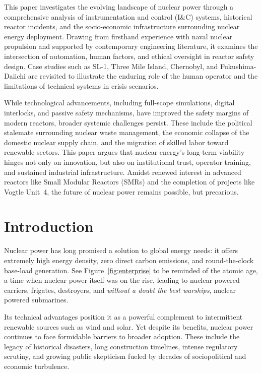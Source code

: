 \documentclass[12pt]{article}
\begin{document}
This paper investigates the evolving landscape of nuclear power through a comprehensive analysis of instrumentation and control (I\&C) systems, historical reactor incidents, and the socio-economic infrastructure surrounding nuclear energy deployment. Drawing from firsthand experience with naval nuclear propulsion and supported by contemporary engineering literature, it examines the intersection of automation, human factors, and ethical oversight in reactor safety design. Case studies such as SL-1, Three Mile Island, Chernobyl, and Fukushima-Daiichi are revisited to illustrate the enduring role of the human operator and the limitations of technical systems in crisis scenarios.

While technological advancements, including full-scope simulations, digital interlocks, and passive safety mechanisms, have improved the safety margins of modern reactors, broader systemic challenges persist. These include the political stalemate surrounding nuclear waste management, the economic collapse of the domestic nuclear supply chain, and the migration of skilled labor toward renewable sectors. This paper argues that nuclear energy's long-term viability hinges not only on innovation, but also on institutional trust, operator training, and sustained industrial infrastructure. Amidst renewed interest in advanced reactors like Small Modular Reactors (SMRs) and the completion of projects like Vogtle Unit~4, the future of nuclear power remains possible, but precarious.

\newpage

\section{Introduction}

Nuclear power has long promised a solution to global energy needs: it offers
extremely high energy density, zero direct carbon emissions, and round-the-clock
base-load generation. See Figure~\ref{fig:enterprise} to be reminded of the
atomic age, a time when nuclear power itself was on the rise, leading to nuclear
powered carriers, frigates, destroyers, and \textit{without a doubt the best
warships}, nuclear powered submarines.

Its technical advantages position it as a powerful complement to intermittent renewable sources such as wind and solar. Yet despite its benefits, nuclear power continues to face formidable barriers to broader adoption. These include the legacy of historical disasters, long construction timelines, intense regulatory scrutiny, and growing public skepticism fueled by decades of sociopolitical and economic turbulence.
\end{document}

